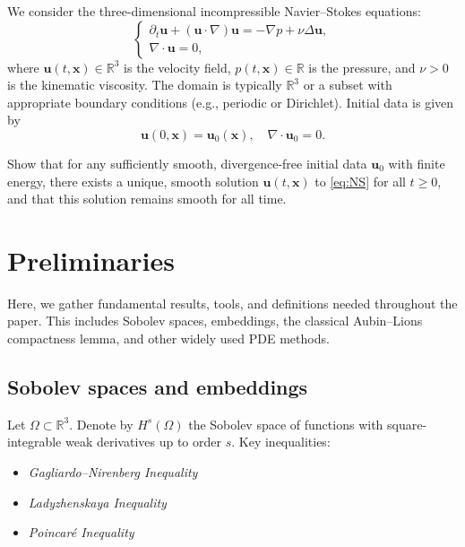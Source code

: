 \documentclass[11pt]{article}
\numberwithin{equation}{section}
\begin{document}
We consider the three-dimensional incompressible Navier--Stokes equations:
\begin{equation}\label{eq:NS}
\begin{cases}
\partial_t \mathbf{u} + (\mathbf{u}\cdot \nabla)\mathbf{u}
  = -\nabla p + \nu \Delta \mathbf{u}, \\
\nabla \cdot \mathbf{u} = 0,
\end{cases}
\end{equation}
where \( \mathbf{u}(t,\mathbf{x}) \in \mathbb{R}^3 \) is the velocity field,
\( p(t,\mathbf{x}) \in \mathbb{R} \) is the pressure, and \( \nu > 0 \) is the
kinematic viscosity. The domain is typically \( \mathbb{R}^3 \) or a subset
with appropriate boundary conditions (e.g., periodic or Dirichlet). Initial data
is given by
\[
\mathbf{u}(0,\mathbf{x}) = \mathbf{u}_0(\mathbf{x}),
\quad \nabla \cdot \mathbf{u}_0 = 0.
\]

\begin{definition}
Show that for any sufficiently smooth, divergence-free initial data
\(\mathbf{u}_0\) with finite energy, there exists a unique, smooth solution
\(\mathbf{u}(t,\mathbf{x})\) to \eqref{eq:NS} for all \( t \ge 0 \),
and that this solution remains smooth for all time.
\end{definition}

\section{Preliminaries}\label{sec:prelims}

Here, we gather fundamental results, tools, and definitions needed throughout
the paper. This includes Sobolev spaces, embeddings, the classical Aubin--Lions
compactness lemma, and other widely used PDE methods.

\subsection{Sobolev spaces and embeddings}

Let \(\Omega \subset \mathbb{R}^3\). Denote by \(H^s(\Omega)\) the Sobolev space
of functions with square-integrable weak derivatives up to order \(s\).
Key inequalities:
\begin{itemize}[leftmargin=2em]
\item \emph{Gagliardo--Nirenberg Inequality}
\item \emph{Ladyzhenskaya Inequality}
\item \emph{Poincar\'{e} Inequality}
\end{itemize}
\end{document}
